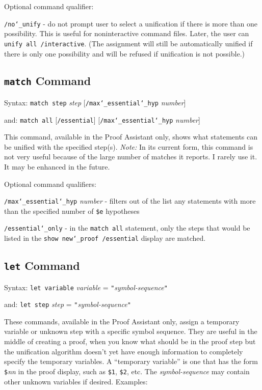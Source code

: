 Optional command qualifier:

    \texttt{/no{\char`\_}unify} - do not prompt user to select a unification if there is
        more than one possibility.  This is useful for noninteractive
        command files.  Later, the user can \texttt{unify all /interactive}.
        (The assignment will still be automatically unified if there is only
        one possibility and will be refused if unification is not possible.)



\subsection{\texttt{match} Command}
Syntax:  \texttt{match step} {\em step} [\texttt{/max{\char`\_}essential{\char`\_}hyp}
{\em number}]

    and:  \texttt{match all} [\texttt{/essential}]
          [\texttt{/max{\char`\_}essential{\char`\_}hyp} {\em number}]

This command, available in the Proof Assistant only, shows what
statements can be unified with the specified step(s).  {\em Note:} In
its current form, this command is not very useful because of the large
number of matches it reports.  I rarely use it.
It may be enhanced in the future.

Optional command qualifiers:

    \texttt{/max{\char`\_}essential{\char`\_}hyp} {\em number} - filters out
        of the list any statements
        with more than the specified number of
        \texttt{\$e} hypotheses

    \texttt{/essential{\char`\_}only} - in the \texttt{match all} statement, only
        the steps that
        would be listed in the \texttt{show new{\char`\_}proof /essential} display are
        matched.



\subsection{\texttt{let} Command}
Syntax: \texttt{let variable} {\em variable} = \verb/"/{\em symbol-sequence}\verb/"/

  and: \texttt{let step} {\em step} = \verb/"/{\em symbol-sequence}\verb/"/

These commands, available in the Proof Assistant
only, assign a temporary variable or unknown
step with a specific symbol sequence.  They are useful in the middle of
creating a proof, when you know what should be in the proof step but the
unification algorithm doesn't yet have enough information to completely
specify the temporary variables.  A ``temporary variable'' is one that
has the form \texttt{\$}{\em nn} in the proof display, such as
\texttt{\$1}, \texttt{\$2}, etc.  The {\em symbol-sequence} may contain
other unknown variables if desired.  Examples:

